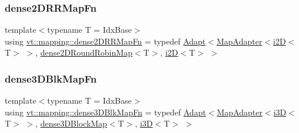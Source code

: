 \subsubsection{\texorpdfstring{dense2\+D\+R\+R\+Map\+Fn}{dense2DRRMapFn}}
{\footnotesize\ttfamily template$<$typename T  = Idx\+Base$>$ \\
using \hyperlink{namespacevt_1_1mapping_a7a86c7f1af7a323cd67e97e8897804e4}{vt\+::mapping\+::dense2\+D\+R\+R\+Map\+Fn} = typedef \hyperlink{namespacevt_1_1mapping_aafe187035ce8df02f31983e37cdb6a5d}{Adapt}$<$\hyperlink{namespacevt_1_1mapping_a41b113c28bb6430fbcb5be66e08ccf9f}{Map\+Adapter}$<$\hyperlink{namespacevt_1_1mapping_a6448c875e0807b43f31e96fc5b0cec04}{i2D}$<$T$>$ $>$, \hyperlink{namespacevt_1_1mapping_ac606a5886c93a4dbb05dfead285c30c6}{dense2\+D\+Round\+Robin\+Map}$<$T$>$, \hyperlink{namespacevt_1_1mapping_a6448c875e0807b43f31e96fc5b0cec04}{i2D}$<$T$>$ $>$}

\mbox{\label{namespacevt_1_1mapping_a20b151291c38fe5008608b65f28759ac}} 
\subsubsection{\texorpdfstring{dense3\+D\+Blk\+Map\+Fn}{dense3DBlkMapFn}}
{\footnotesize\ttfamily template$<$typename T  = Idx\+Base$>$ \\
using \hyperlink{namespacevt_1_1mapping_a20b151291c38fe5008608b65f28759ac}{vt\+::mapping\+::dense3\+D\+Blk\+Map\+Fn} = typedef \hyperlink{namespacevt_1_1mapping_aafe187035ce8df02f31983e37cdb6a5d}{Adapt}$<$\hyperlink{namespacevt_1_1mapping_a41b113c28bb6430fbcb5be66e08ccf9f}{Map\+Adapter}$<$\hyperlink{namespacevt_1_1mapping_af435b967b9ed1ccb5ec4effdbd9abd13}{i3D}$<$T$>$ $>$, \hyperlink{namespacevt_1_1mapping_a91764d84e5e6d8253872740cb8424726}{dense3\+D\+Block\+Map}$<$T$>$, \hyperlink{namespacevt_1_1mapping_af435b967b9ed1ccb5ec4effdbd9abd13}{i3D}$<$T$>$ $>$}

\mbox{\label{namespacevt_1_1mapping_a4161eb1a3c61249a269654c4529788e0}} 
